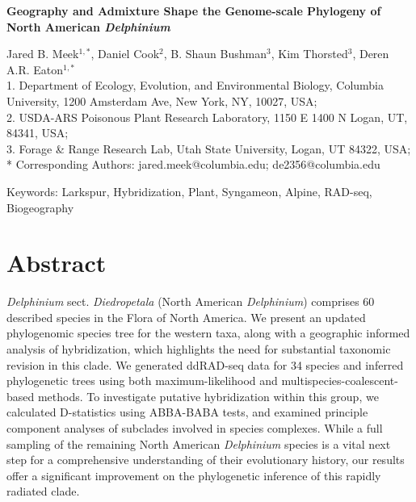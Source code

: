 \documentclass[11pt]{article}
\begin{document}
\begin{center}
	{\bf \Large
	Geography and Admixture Shape the Genome-scale Phylogeny of \\
	North American \emph{Delphinium}\\[0.5cm]
	}

Jared B. Meek$^{1,*}$, Daniel Cook$^2$, B. Shaun Bushman$^3$, Kim Thorsted$^3$, Deren A.R. Eaton$^{1,*}$\\[0.5cm]

1. Department of Ecology, Evolution, and Environmental Biology, Columbia University, 1200 Amsterdam Ave, New York, NY, 10027, USA;\\
2. USDA-ARS Poisonous Plant Research Laboratory, 1150 E 1400 N Logan, UT, 84341, USA;\\ 3. Forage \& Range Research Lab, Utah State University, Logan, UT 84322, USA;\\ 
* Corresponding Authors: jared.meek@columbia.edu; de2356@columbia.edu

\end{center}

Keywords: Larkspur, Hybridization, Plant, Syngameon, Alpine, RAD-seq, Biogeography

\RaggedRight

\section*{Abstract}
\emph{Delphinium} sect. \emph{Diedropetala} (North American \emph{Delphinium}) comprises 60 described species in the Flora of North America. We present an updated phylogenomic species tree for the western taxa, along with a geographic informed analysis of hybridization, which highlights the need for substantial taxonomic revision in this clade. We generated ddRAD-seq data for 34 species and inferred phylogenetic trees using both maximum-likelihood and multispecies-coalescent-based methods. To investigate putative hybridization within this group, we calculated D-statistics using ABBA-BABA tests, and examined principle component analyses of subclades involved in species complexes. While a full sampling of the remaining North American \emph{Delphinium} species is a vital next step for a comprehensive understanding of their evolutionary history, our results offer a significant improvement on the phylogenetic inference of this rapidly radiated clade.
\end{document}
